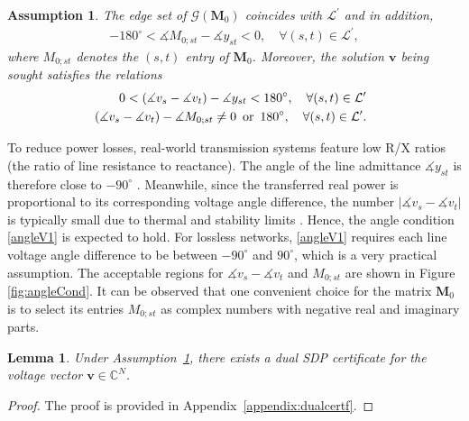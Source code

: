\documentclass[journal,twoside]{IEEEtran}
\newtheorem{lemma}{Lemma}
\newtheorem{assumption}{Assumption}
\newcommand{\bv}{\mathbf{v}}
\newcommand{\bM}{\mathbf{M}}
\newcommand{\cL}{{\mathcal L}}
\begin{document}
\begin{assumption}\label{asmp1}
The edge set of $\mathscr{G}(\mathbf{M}_0)$ coincides with $\cL^{\prime}$ and in addition,
\begin{align} \label{angleMy}
-180^{\circ}<\measuredangle M_{0;st}-\measuredangle y_{st}<0,\quad \forall (s,t)\in\cL^{\prime},
\end{align}
where $M_{0;st}$ denotes the $(s,t)$ entry of $\bM_0$.
Moreover, the solution $\mathbf{v}$ being sought satisfies the relations
\begin{subequations}
\label{angleV}
\begin{align}
\hspace{-0.2cm}0<(\measuredangle v_{s}-\measuredangle v_{t})-\measuredangle y_{st}<180^{\circ},\quad \forall (s,t)\in\cL^{\prime} \label{angleV1}\\
\hspace{-0.2cm}(\measuredangle v_{s}-\measuredangle v_{t})-\measuredangle M_{0;st}\neq 0 \, \ \mathrm{or}\, \ 180^{\circ},\quad \forall (s,t)\in\cL^{\prime}. \label{angleV12}
\end{align}
\end{subequations}
\end{assumption}
To reduce power losses, real-world transmission systems feature low R/X ratios (the ratio of line resistance to reactance).
The angle of the line admittance $\measuredangle y_{st}$ is therefore close to $-90^{\circ}$ \cite[Sec. 3.7]{Weedy12}.
Meanwhile, since the transferred real power is proportional to its corresponding voltage angle difference, 
the number $|\measuredangle v_{s}-\measuredangle v_{t}|$ is typically small due to thermal and stability limits \cite{GG13,Andersson08}.
Hence, the angle condition \eqref{angleV1} is expected to hold. For lossless networks,  \eqref{angleV1} requires each line voltage angle difference to be between $-90^{\circ}$ and $90^{\circ}$, which is a very practical assumption.  The acceptable regions for $\measuredangle v_{s}-\measuredangle v_{t}$
and $M_{0;st}$ are shown in Figure \ref{fig:angleCond}. It can be observed that one convenient choice for the matrix $\bM_{0}$ is to select its entries $M_{0;st}$  as  complex numbers with negative real and imaginary parts.






\begin{lemma}
\label{lem:dualcertf}
Under Assumption~\ref{asmp1}, there exists a dual SDP certificate for the voltage vector $\bv \in \mathbb{C}^N$.
\end{lemma}
\begin{proof}
The proof is provided in  Appendix~\ref{appendix:dualcertf}.
\end{proof}
\end{document}
